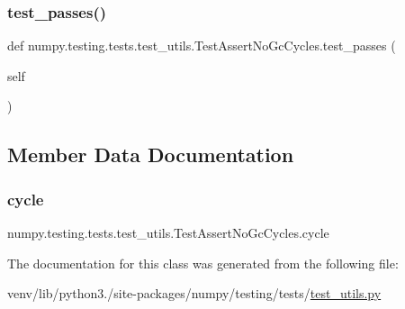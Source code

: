 \subsubsection{\texorpdfstring{test\+\_\+passes()}{test\_passes()}}
{\footnotesize\ttfamily def numpy.\+testing.\+tests.\+test\+\_\+utils.\+Test\+Assert\+No\+Gc\+Cycles.\+test\+\_\+passes (\begin{DoxyParamCaption}\item[{}]{self }\end{DoxyParamCaption})}



\subsection{Member Data Documentation}
\mbox{\label{classnumpy_1_1testing_1_1tests_1_1test__utils_1_1TestAssertNoGcCycles_aa32d2b6ded4c96c408154f5eb8babc65}} 
\subsubsection{\texorpdfstring{cycle}{cycle}}
{\footnotesize\ttfamily numpy.\+testing.\+tests.\+test\+\_\+utils.\+Test\+Assert\+No\+Gc\+Cycles.\+cycle}



The documentation for this class was generated from the following file\+:\begin{DoxyCompactItemize}
\item 
venv/lib/python3./site-\/packages/numpy/testing/tests/\hyperlink{numpy_2testing_2tests_2test__utils_8py}{test\+\_\+utils.\+py}\end{DoxyCompactItemize}
